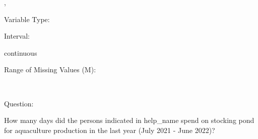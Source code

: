 \documentclass[
]{article}
\begin{document}
,

\begin{minipage}[t]{0.3\linewidth}

\colorbox{mypink1}{}

\end{minipage}%
\begin{minipage}[t]{0.7\linewidth}

\colorbox{mypink1}{\makebox[\textwidth]{\strut\bfseries\color{black}  
 }}

\end{minipage}

\begin{minipage}[t]{0.3\linewidth}

Variable Type:

\end{minipage}%
\begin{minipage}[t]{0.7\linewidth}

\end{minipage}

\begin{minipage}[t]{0.3\linewidth}

Interval:

\end{minipage}%
\begin{minipage}[t]{0.7\linewidth}

continuous

\end{minipage}

\begin{minipage}[t]{0.3\linewidth}

Range of Missing Values (M):

\end{minipage}%
\begin{minipage}[t]{0.7\linewidth}

~

\end{minipage}

\begin{minipage}[t]{0.3\linewidth}

Question:

\end{minipage}%
\begin{minipage}[t]{0.7\linewidth}

How many days did the persons indicated in help\_name spend on stocking
pond for aquaculture production in the last year (July 2021 - June
2022)?

\end{minipage}
\end{document}
